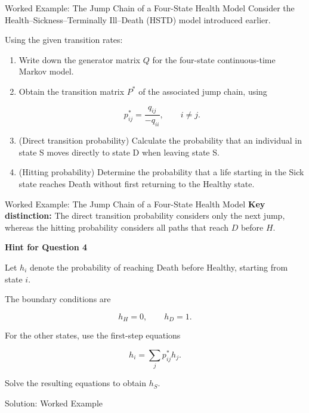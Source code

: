\documentclass[
  ignorenonframetext,
  aspectratio=169,
]{beamer}
\begin{document}
\begin{frame}{Worked Example: The Jump Chain of a Four-State Health
Model}
\protect{}\label{worked-example-the-jump-chain-of-a-four-state-health-model}
Consider the Health--Sickness--Terminally Ill--Death (HSTD) model
introduced earlier.

Using the given transition rates:

\begin{enumerate}
\item
  Write down the generator matrix \(Q\) for the four-state
  continuous-time Markov model.
\item
  Obtain the transition matrix \(P^*\) of the associated jump chain,
  using

  \[
  p_{ij}^*=\frac{q_{ij}}{-q_{ii}},
  \qquad i\neq j.
  \]
\item
  (Direct transition probability) Calculate the probability that an
  individual in state S moves directly to state D when leaving state S.
\item
  (Hitting probability) Determine the probability that a life starting
  in the Sick state reaches Death without first returning to the Healthy
  state.
\end{enumerate}
\end{frame}

\begin{frame}{Worked Example: The Jump Chain of a Four-State Health
Model}
\protect{}\label{worked-example-the-jump-chain-of-a-four-state-health-model-1}
\textbf{Key distinction:} The direct transition probability considers
only the next jump, whereas the hitting probability considers all paths
that reach \(D\) before \(H\).

\textbf{Hint for Question 4}

Let \(h_i\) denote the probability of reaching Death before Healthy,
starting from state \(i\).

The boundary conditions are

\[
h_H=0,\qquad h_D=1.
\]

For the other states, use the first-step equations

\[
h_i=\sum_j p_{ij}^*h_j.
\]

Solve the resulting equations to obtain \(h_S\).
\end{frame}

\begin{frame}{Solution: Worked Example}
\protect{}\label{solution-worked-example-1}
\end{frame}
\end{document}
